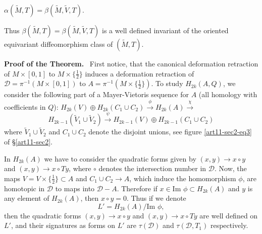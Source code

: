 \begin{theorem*}
$\alpha(\widetilde{M},T)=\beta(\widetilde{M},\widetilde{V},T)$.

Thus $\beta(\widetilde{M},T)=\beta(\widetilde{M},\widetilde{V},T)$ is a well defined invariant of the oriented equivariant diffeomorphism class of $(\widetilde{M},T)$.
\end{theorem*}

\noindent
{\bf Proof of the Theorem.}~ First notice, that the canonical deformation retraction of $M\times [0,1]$ to $M\times \{\frac{1}{2}\}$ induces a deformation retraction of $\mathscr{D}=\pi^{-1}(M\times [0,1])$ to $A=\pi^{-1}(M\times \{\frac{1}{2}\})$. To study $H_{2k}(A,Q)$, we consider the following part of a Mayer-Vietoris sequence for $A$ (all homology with coefficients in $Q$): $H_{2k}(V)\oplus H_{2k}(C_{1}\cup C_{2})\xrightarrow{\phi}H_{2k}(A)\xrightarrow{\chi}$\pageoriginale
$$
H_{2k-1}(\widetilde{V}_{1}\cup \widetilde{V}_{2})\xrightarrow{\psi}H_{2k-1}(V)\oplus H_{2k-1}(C_{1}\cup C_{2})
$$
where $\widetilde{V}_{1}\cup \widetilde{V}_{2}$ and $C_{1}\cup C_{2}$ denote the disjoint unions, see figure \eqref{art11-sec2-eq3} of \S\ref{art11-sec2}.

In $H_{2k}(A)$ we have to consider the quadratic forms given by $(x,y)\to x\circ y$ and $(x,y)\to x\circ Ty$, where $\circ$ denotes the intersection number in $\mathscr{D}$. Now, the maps $V=V\times \{\frac{1}{2}\}\subset A$ and $C_{1}\cup C_{2}\to A$, which induce the homomorphism $\phi$, are homotopic in $\mathscr{D}$ to maps into $\mathscr{D}-A$. Therefore if $x\in \text{Im~}\phi\subset H_{2k}(A)$ and $y$ is any element of $H_{2k}(A)$, then $x\circ y=0$. Thus if we denote
\begin{equation*}
L'=H_{2k}(A)/\text{Im~}\phi,\tag{2}\label{art11-sec3-eq2}
\end{equation*}
then the quadratic forms $(x,y)\to x\circ y$ and $(x,y)\to x\circ Ty$ are well defined on $L'$, and their signatures as forms on $L'$ are $\tau(\mathscr{D})$ and $\tau(\mathscr{D},T_{1})$ respectively.

